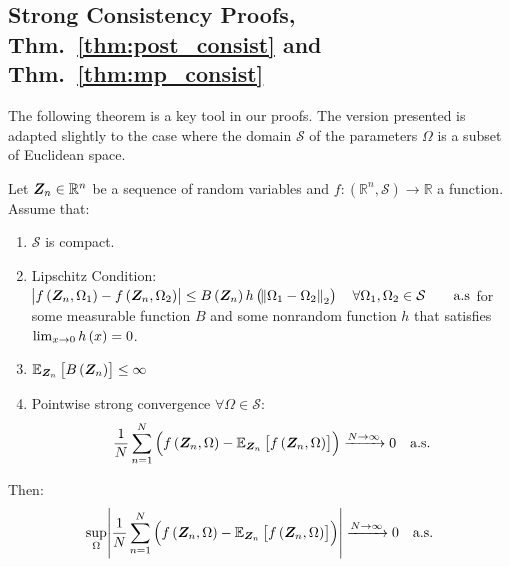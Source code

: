 \subsection{Strong Consistency Proofs, Thm.~\ref{thm:post_consist} and Thm.~\ref{thm:mp_consist}}
{The following theorem is a key tool in our proofs. The version presented is  adapted slightly to the case where the domain $\mathcal{S}$ of the parameters $\Omega$ is a subset of Euclidean space.} 
\begin{theorem}\label{lemma:sulln}
    Let  $\Z_n\in\mathbb{R}^n$ be a sequence of random variables and $f:(\mathbb{R}^n,\mathcal{S})\rightarrow \mathbb{R}$ %
    a function.
     Assume that:
    \begin{enumerate}[label=\text{\ref{lemma:sulln}}.\arabic*,labelsep=*, leftmargin=*]
    \item $\mathcal{S}$ is compact.\label{assume:sulln_compact} %
    \item  Lipschitz Condition: $\abs{f\brackets{\Z_n,\Omega_1}-f\brackets{\Z_n,\Omega_2}}\leq B\brackets{\Z_n}h\brackets{
    {\norm{\Omega_1-\Omega_2}_2}}\quad\forall\Omega_1, \Omega_2\in\mathcal{S} \qquad \text{a.s}$
    for some measurable function $B$ and some nonrandom function $h$ that  satisfies {$\lim_{x\rightarrow 0}h\left(x\right) =0$}.\label{assume:lip_cond}
    
    \item $\expectation{B\brackets{\Z_n}}{\Z_n}\leq \infty$\label{assume:bound_b}
    
    \item Pointwise strong convergence %
    $\forall\Omega\in\mathcal{S}$:\label{assume:sulln_conv}
    $$\frac{1}{N}\sum_{n=1}^N \brackets{f\brackets{\Z_n,\Omega}- \expectation{f\brackets{\Z_n,\Omega}}{\Z_n}}\xrightarrow{N\rightarrow\infty}0 \quad \text{a.s.}$$
\end{enumerate}
Then:
\begin{equation*}
    \sup\limits_{\Omega}\abs{\frac{1}{N}\sum_{n=1}^N \brackets{f\brackets{\Z_n,\Omega}- \expectation{f\brackets{\Z_n,\Omega}}{\Z_n}}}\xrightarrow{N\rightarrow\infty}0 \quad \text{a.s.}
\end{equation*}
\end{theorem}



